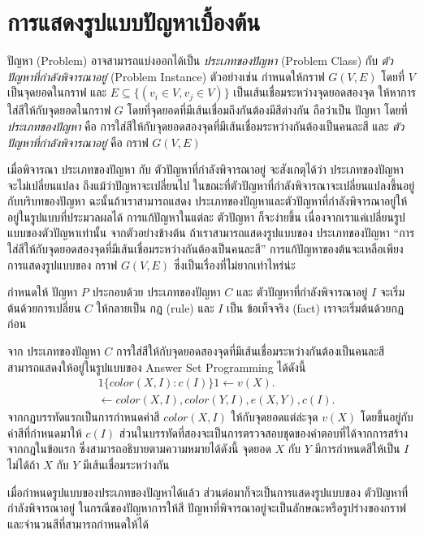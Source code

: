 \chapter{การแสดงรูปแบบปัญหาเบื้องต้น}
%
\par{
ปัญหา (Problem) อาจสามารถแบ่งออกได้เป็น
\textit{ประเภทของปัญหา} (Problem Class)
กับ \textit{ตัวปัญหาที่กำลังพิจารณาอยู่} (Problem Instance)
ตัวอย่างเช่น กำหนดให้กราฟ $G(V,E)$ โดยที่ $V$ เป็นจุดยอดในกราฟ
และ $E \subseteq \{(v_i \in V,v_j \in V)\}$ เป็นเส้นเชื่อมระหว่างจุดยอดสองจุด 
ให้หาการใส่สีให้กับจุดยอดในกราฟ $G$ โดยที่จุดยอดที่มีเส้นเชื่อมถึงกันต้องมีสีต่างกัน 
ถือว่าเป็น ปัญหา โดยที่ 
\textit{ประเภทของปัญหา} คือ การใส่สีให้กับจุดยอดสองจุดที่มีเส้นเชื่อมระหว่างกันต้องเป็นคนละสี
และ \textit{ตัวปัญหาที่กำลังพิจารณาอยู่} คือ กราฟ $G(V,E)$
}
%
\par{
เมื่อพิจารณา ประเภทของปัญหา กับ ตัวปัญหาที่กำลังพิจารณาอยู่ 
จะสังเกตุได้ว่า ประเภทของปัญหา จะไม่เปลี่ยนแปลง ถึงแม้ว่าปัญหาจะเปลี่ยนไป 
ในขณะที่ตัวปัญหาที่กำลังพิจารณาจะเปลี่ยนแปลงขึ้นอยู่กับบริบทของปัญหา
ฉะนั้นถ้าเราสามารถแสดง 
ประเภทของปัญหาและตัวปัญหาที่กำลังพิจารณาอยู่ให้อยู่ในรูปแบบที่ประมวลผลได้
การแก้ปัญหาในแต่ละ ตัวปัญหา ก็จะง่ายขึ้น 
เนื่องจากเราแค่เปลี่ยนรูปแบบของตัวปัญหาเท่านั้น
จากตัวอย่างข้างต้น ถ้าเราสามารถแสดงรูปแบบของ ประเภทของปัญหา 
``การใส่สีให้กับจุดยอดสองจุดที่มีเส้นเชื่อมระหว่างกันต้องเป็นคนละสี''
การแก้ปัญหาของต้นจะเหลือเพียงการแสดงรูปแบบของ กราฟ $G(V,E)$ 
ซึ่งเป็นเรื่องที่ไม่ยากเท่าไหร่น่ะ
}
%
\par{
กำหนดให้ ปัญหา $P$ ประกอบด้วย ประเภทของปัญหา $C$ และ
ตัวปัญหาที่กำลังพิจารณาอยู่ $I$ จะเริ่มต้นด้วยการเปลี่ยน $C$ ให้กลายเป็น
กฎ (rule) และ $I$ เป็น ข้อเท็จจริง (fact)
เราจะเริ่มต้นด้วยกฏก่อน
}
%
\par{
จาก ประเภทของปัญหา $C$ การใส่สีให้กับจุดยอดสองจุดที่มีเส้นเชื่อมระหว่างกันต้องเป็นคนละสี
สามารถแสดงให้อยู่ในรูปแบบของ Answer Set Programming ได้ดังนี้
\begin{align*}
& 1 \{color(X,I) : c(I)\} 1 \leftarrow  v(X). \\
& \leftarrow color(X,I), color(Y,I), e(X,Y), c(I).
\end{align*}
จากกฏบรรทัดแรกเป็นการกำหนดค่าสี $color(X,I)$ 
ให้กับจุดยอดแต่ล่ะจุด $v(X)$ 
โดยขึ้นอยู่กับค่าสีที่กำหนดมาให้ $c(I)$
ส่วนในบรรทัดที่สองจะเป็นการตรวจสอบชุดของคำตอบที่ได้จากการสร้างจากกฎในข้อแรก
ซึ่งสามารถอธิบายตามความหมายได้ดังนี้
จุดยอด $X$ กับ $Y$ มีการกำหนดสีให้เป็น $I$
ไม่ได้ถ้า $X$ กับ $Y$ มีเส้นเชื่อมระหว่างกัน
}
%
\par{
เมื่อกำหนดรูปแบบของประเภทของปัญหาได้แล้ว 
ส่วนต่อมาก็จะเป็นการแสดงรูปแบบของ
ตัวปัญหาที่กำลังพิจารณาอยู่ 
ในกรณีของปัญหาการให้สี 
ปัญหาที่พิจารณาอยู่จะเป็นลักษณะหรือรูปร่างของกราฟและจำนวนสีที่สามารถกำหนดให้ได้
}
